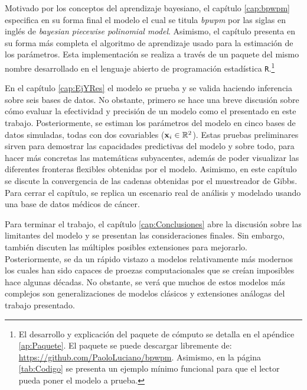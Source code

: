 \documentclass[../Main/Main.tex]{subfiles}
\begin{document}
Motivado por los conceptos del aprendizaje bayesiano, el capítulo \ref{cap:bpwpm} especifica en su forma final el modelo el cual se titula \emph{bpwpm} por las siglas en inglés de \textit{bayesian piecewise polinomial model}. Asimismo, el capítulo presenta en su forma más completa el algoritmo de aprendizaje usado para la estimación de los parámetros. Esta implementación se realiza a través de un paquete del mismo nombre desarrollado en el lenguaje abierto de programación estadística \verb|R|.\footnote{El desarrollo y explicación del paquete de cómputo se detalla en el apéndice \ref{ap:Paquete}. El paquete se puede descargar libremente de: \url{https://github.com/PaoloLuciano/bpwpm}. Asimismo, en la página \ref{tab:Codigo} se presenta un ejemplo mínimo funcional para que el lector pueda poner el modelo a prueba.}

En el capítulo \ref{cap:EjYRes} el modelo se prueba y se valida haciendo inferencia sobre seis bases de datos. No obstante, primero se hace una breve discusión sobre cómo evaluar la efectividad y precisión de un modelo como el presentado en este trabajo. Posteriormente, se estiman los parámetros del modelo en cinco bases de datos simuladas, todas con dos covariables ($\mathbf{x}_i \in \mathbb{R}^2$). Estas pruebas preliminares sirven para demostrar las capacidades predictivas del modelo y sobre todo, para hacer más concretas las matemáticas subyacentes, además de poder visualizar las diferentes fronteras flexibles obtenidas por el modelo. Asimismo, en este capítulo se discute la convergencia de las cadenas obtenidas por el muestreador de Gibbs. Para cerrar el capítulo, se replica un escenario real de análisis y modelado usando una base de datos médicos de cáncer.

Para terminar el trabajo, el capítulo \ref{cap:Conclusiones} abre la discusión sobre las limitantes del modelo y se presentan las consideraciones finales. Sin embargo, también discuten las múltiples posibles extensiones para mejorarlo. Posteriormente, se da un rápido vistazo a modelos relativamente más modernos los cuales han sido capaces de proezas computacionales que se creían imposibles hace algunas décadas. No obstante, se verá que muchos de estos modelos más complejos son generalizaciones de modelos clásicos y extensiones análogas del trabajo presentado. 
\end{document}
